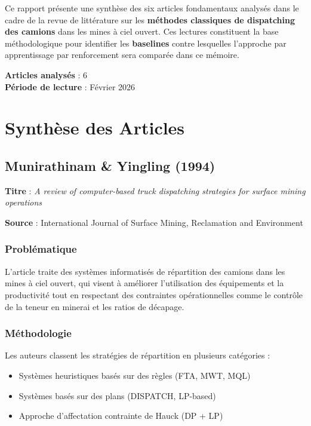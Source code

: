 \documentclass[12pt,a4paper]{article}
\begin{document}
Ce rapport pr\'esente une synth\`ese des six articles fondamentaux analys\'es dans le cadre de la revue de litt\'erature sur les \textbf{m\'ethodes classiques de dispatching des camions} dans les mines \`a ciel ouvert. Ces lectures constituent la base m\'ethodologique pour identifier les \textbf{baselines} contre lesquelles l'approche par apprentissage par renforcement sera compar\'ee dans ce m\'emoire.

\textbf{Articles analys\'es} : 6\\
\textbf{P\'eriode de lecture} : F\'evrier 2026

\section{Synth\`ese des Articles}

\subsection{Munirathinam \& Yingling (1994)}

\textbf{Titre} : \textit{A review of computer-based truck dispatching strategies for surface mining operations}

\textbf{Source} : International Journal of Surface Mining, Reclamation and Environment

\subsubsection{Probl\'ematique}

L'article traite des syst\`emes informatis\'es de r\'epartition des camions dans les mines \`a ciel ouvert, qui visent \`a am\'eliorer l'utilisation des \'equipements et la productivit\'e tout en respectant des contraintes op\'erationnelles comme le contr\^ole de la teneur en minerai et les ratios de d\'ecapage.

\subsubsection{M\'ethodologie}

Les auteurs classent les strat\'egies de r\'epartition en plusieurs cat\'egories :
\begin{itemize}
    \item Syst\`emes heuristiques bas\'es sur des r\`egles (FTA, MWT, MQL)
    \item Syst\`emes bas\'es sur des plans (DISPATCH, LP-based)
    \item Approche d'affectation contrainte de Hauck (DP + LP)
\end{itemize}
\end{document}
